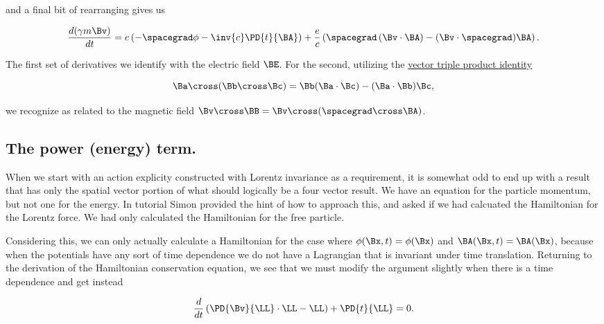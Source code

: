 and a final bit of rearranging gives us

\begin{equation}\label{eqn:lorentzForceHamiltonian:n}
\frac{d(\gamma m \Bv)}{dt} =
e \left( -\spacegrad \phi - \inv{c} \PD{t}{\BA}
\right)
+ \frac{e}{c} \left( 
\spacegrad \left( \Bv \cdot \BA \right) - (\Bv \cdot \spacegrad) \BA
\right).
\end{equation}

The first set of derivatives we identify with the electric field $\BE$.  For the second, utilizing the \href{http://en.wikipedia.org/wiki/Triple_product#Vector_triple_product}{vector triple product identity} \cite{wiki:tripleProduct}

\begin{equation}\label{eqn:lorentzForceHamiltonian:n}
\Ba \cross (\Bb \cross \Bc) = \Bb (\Ba \cdot \Bc) - (\Ba \cdot \Bb) \Bc,
\end{equation}

we recognize as related to the magnetic field $\Bv \cross \BB = \Bv \cross (\spacegrad \cross \BA)$.

\subsection{The power (energy) term.}

When we start with an action explicity constructed with Lorentz invariance as a requirement, it is somewhat odd to end up with a result that has only the spatial vector portion of what should logically be a four vector result.  We have an equation for the particle momentum, but not one for the energy.  In tutorial Simon provided the hint of how to approach this, and asked if we had calcuated the Hamiltonian for the Lorentz force.   We had only calculated the Hamiltonian for the free particle.

Considering this, we can only actually calculate a Hamiltonian for the case where $\phi(\Bx, t) = \phi(\Bx)$ and $\BA(\Bx, t) = \BA(\Bx)$, because when the potentials have any sort of time dependence we do not have a Lagrangian that is invariant under time translation.  Returning to the derivation of the Hamiltonian conservation equation, we see that we must modify the argument slightly when there is a time dependence and get instead

\begin{equation}\label{eqn:lorentzForceHamiltonian:n}
\frac{d}{dt} \left( \PD{\Bv}{\LL} \cdot \LL - \LL \right) + \PD{t}{\LL} = 0.
\end{equation}

